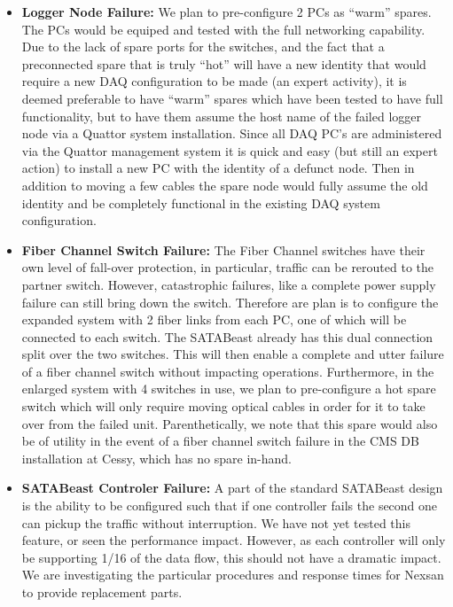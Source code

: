 \begin{itemize} 
\item {\bf Logger Node Failure:} We plan to pre-configure 2 PCs as ``warm'' spares.
The PCs would be equiped and tested with the full networking capability.
Due to the lack of spare ports for the switches, and the fact that
a preconnected spare that is truly ``hot'' will have a new identity
that would require a new DAQ configuration to be made (an expert activity),
it is deemed preferable to have ``warm'' spares which have been tested
to have full functionality, but to have them assume the host name of the
failed logger node via a Quattor system installation.
Since all DAQ PC's are administered via the Quattor management system
it is quick and easy (but still an expert action) to install a new PC with
the identity of a defunct node.
Then in addition to moving a few cables the spare node would fully assume
the old identity and be completely
functional in the existing DAQ system configuration. 

\item {\bf Fiber Channel Switch Failure:} The Fiber Channel switches have 
their own level of fall-over protection, in particular, traffic can
be rerouted to the partner switch.
However, catastrophic failures, like a complete power supply failure
can still bring down the switch.
Therefore are plan is to configure the expanded system with 2 fiber links
from each PC, one of which will be connected to each switch.
The SATABeast already has this dual connection split over the two switches.
This will then enable a complete and utter failure of a fiber channel
switch without impacting operations.
Furthermore, in the enlarged system with 4 switches in use, we plan to
pre-configure a hot spare switch which will only require moving optical
cables in order for it to take over from the failed unit.
Parenthetically, we note that this spare would also be of utility
in the event of a fiber channel switch failure in the CMS DB
installation at Cessy,  which has no spare in-hand.

\item {\bf SATABeast Controler Failure:} A part of the standard SATABeast 
design is the ability to be configured such that if one controller fails the second 
one can pickup the traffic without interruption.
We have not yet tested this feature, or seen the performance impact.
However, as each controller will only be supporting 1/16 of the data flow,
this should not have a dramatic impact.
We are investigating the particular procedures and response times
for Nexsan to provide replacement parts.


\end{itemize}

